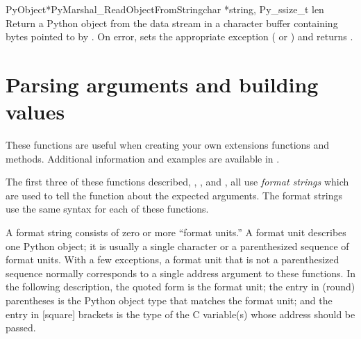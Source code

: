 \begin{cfuncdesc}{PyObject*}{PyMarshal_ReadObjectFromString}{char *string,
                                                             Py_ssize_t len}
  Return a Python object from the data stream in a character buffer
  containing  bytes pointed to by .  On error,
  sets the appropriate exception ( or
  ) and returns \NULL.
\end{cfuncdesc}


\section{Parsing arguments and building values
         \label{arg-parsing}}

These functions are useful when creating your own extensions functions
and methods.  Additional information and examples are available in
.

The first three of these functions described,
,
, and
, all use \emph{format strings} which are
used to tell the function about the expected arguments.  The format
strings use the same syntax for each of these functions.

A format string consists of zero or more ``format units.''  A format
unit describes one Python object; it is usually a single character or
a parenthesized sequence of format units.  With a few exceptions, a
format unit that is not a parenthesized sequence normally corresponds
to a single address argument to these functions.  In the following
description, the quoted form is the format unit; the entry in (round)
parentheses is the Python object type that matches the format unit;
and the entry in [square] brackets is the type of the C variable(s)
whose address should be passed.

